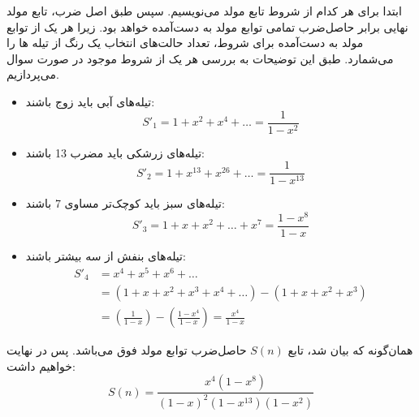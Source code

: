 \p
 ابتدا برای هر کدام از شروط تابع مولد می‌نویسیم. سپس طبق اصل ضرب، تابع مولد نهایی برابر حاصل‌ضرب تمامی  توابع مولد به دست‌آمده خواهد بود.
    زیرا هر یک از توابع مولد به دست‌آمده برای شروط، تعداد حالت‌های انتخاب‌ یک رنگ از تیله ها را می‌شمارد.  
   طبق این توضیحات به بررسی هر یک از شروط موجود در صورت سوال می‌پردازیم.
\begin{itemize}
    \item 
    تیله‌های آبی باید زوج باشند:
    $$S'_{1} = 1 + x^2 + x^4 + \ldots = \frac{1}{1-x^2}$$
    \item
    تیله‌های زرشکی باید مضرب 13 باشند:
    $$S'_{2} = 1 + x^{13} + x^{26} + \ldots = \frac{1}{1-x^{13}}$$
    \item
    تیله‌های سبز باید کوچک‌تر مساوی 7 باشند:
    $$S'_{3} = 1 + x + x^2 + \ldots + x^7 = \frac{1-x^8}{1-x}$$
    \item
    تیله‌های بنفش از سه بیشتر باشند:
    \begin{align*}
    S'_{4} &= x^4 + x^5 + x^6 + \ldots\\
    &= (1+x+x^2+x^3+x^4+\ldots) - (1 + x + x^2 + x^3)\\
    &= (\frac{1}{1-x}) - (\frac{1-x^4}{1-x}) = \frac{x^4}{1-x}
    \end{align*}
\end{itemize}
همان‌گونه که بیان شد، تابع 
$S(n)$
حاصل‌ضرب توابع مولد فوق می‌باشد. پس در نهایت خواهیم داشت:
$$S(n) = \frac{x^4(1-x^8)}{(1-x)^2(1-x^{13})(1-x^{2})}$$
